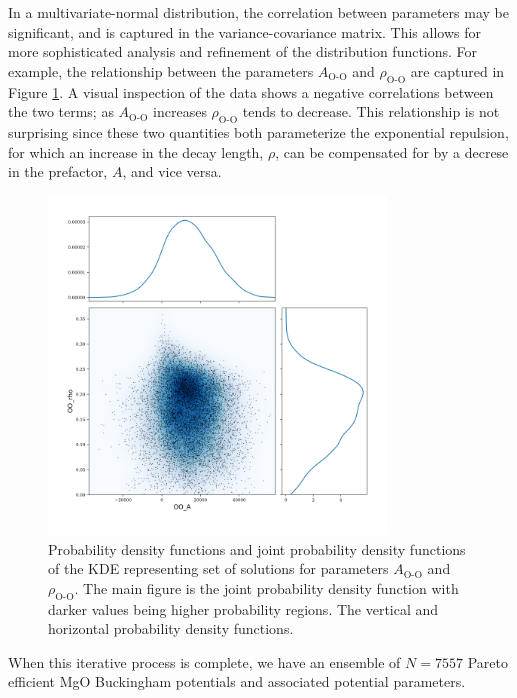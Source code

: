In a multivariate-normal distribution, the correlation between parameters may be significant, and is captured in the variance-covariance matrix. This allows for more sophisticated analysis and refinement of the distribution functions. For example, the relationship between the parameters $A_{\text{O-O}}$ and $\rho_{\text{O-O}}$ are captured in Figure \ref{fig:MgO_biobjective_A_v_rho_OO}.  A visual inspection of the data shows a negative correlations between the two terms; as $A_{\text{O-O}}$ increases  $\rho_{\text{O-O}}$ tends to decrease.  This relationship is not surprising since these two quantities both parameterize the exponential repulsion, for which an increase in the decay length, $\rho$, can be compensated for by a decrese in the prefactor, $A$, and vice versa.

\begin{figure}[ht]
	\centering
  \includegraphics[width=0.8\textwidth]{chapter7/MgO_biobjective_A_v_rho_OO}
  \caption{Probability density functions and joint probability density functions of the KDE representing set of solutions for parameters $A_{\text{O-O}}$ and $\rho_{\text{O-O}}$.  The main figure is the joint probability density function with darker values being higher probability regions.  The vertical and horizontal probability density functions.}
  \label{fig:MgO_biobjective_A_v_rho_OO}
\end{figure}

When this iterative process is complete, we have an ensemble of $N=7557$ Pareto efficient MgO Buckingham potentials and associated potential parameters.


